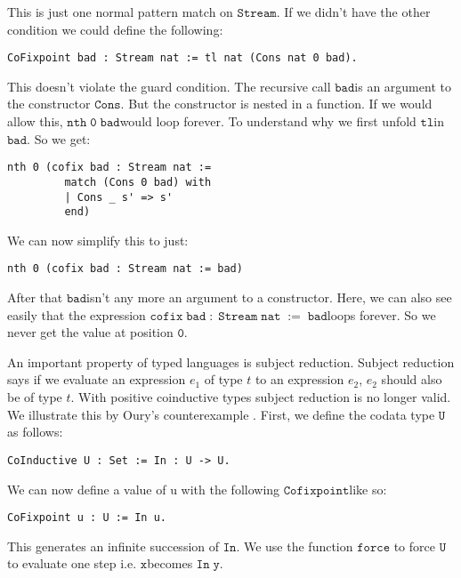 \documentclass[a4paper,cleardoubleempty,BCOR1cm]{scrbook}
\begin{document}
This is just one normal pattern match on $\mathtt{Stream}$.  If we didn't have the
other condition we could define the following:

\begin{verbatim}
CoFixpoint bad : Stream nat := tl nat (Cons nat 0 bad).
\end{verbatim}

This doesn't violate the guard condition.  The recursive call $\mathtt{bad}$\;is an
argument to the constructor $\mathtt{Cons}$.  But the constructor is nested in a
function.  If we would allow this, $\mathtt{nth\;0\;bad}$\;would loop forever.  To
understand why we first unfold $\mathtt{tl}$\;in $\mathtt{bad}$.  So we get:

\begin{verbatim}
nth 0 (cofix bad : Stream nat :=
         match (Cons 0 bad) with
         | Cons _ s' => s'
         end)
\end{verbatim}

We can now simplify this to just:

\begin{verbatim}
nth 0 (cofix bad : Stream nat := bad)
\end{verbatim}

After that $\mathtt{bad}$\;isn't any more an argument to a constructor.  Here, we can also
see easily that the expression $\mathtt{cofix\;bad\;:\;Stream\;nat\;:=\;bad}$\;loops forever.
So we never get the value at position $\mathtt{0}$.

An important property of typed languages is subject reduction. Subject
reduction says if we evaluate an expression \(e_1\) of type \(t\) to an expression
\(e_2\), \(e_2\) should also be of type \(t\). With positive coinductive types subject
reduction is no longer valid. We illustrate this by Oury's counterexample
\cite{oury2008}. First, we define the codata type $\mathtt{U}$\;as follows:

\begin{verbatim}
CoInductive U : Set := In : U -> U.
\end{verbatim}

We can now define a value of u with the following $\mathtt{Cofixpoint}$\;like so:

\begin{verbatim}
CoFixpoint u : U := In u.
\end{verbatim}

This generates an infinite succession of $\mathtt{In}$.  We use the function $\mathtt{force}$
to force $\mathtt{U}$\;to evaluate one step i.e. $\mathtt{x}$\;becomes $\mathtt{In\;y}$.
\end{document}
